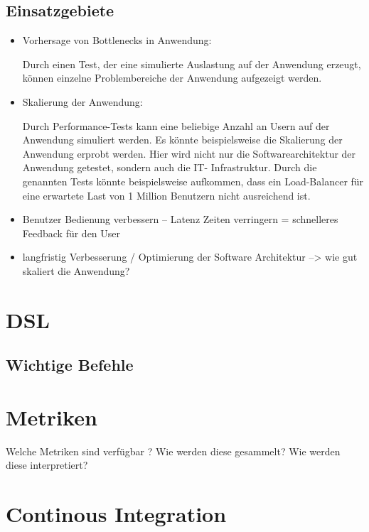 \subsection{Einsatzgebiete}

\begin{itemize}
    \item Vorhersage von Bottlenecks in Anwendung:

    Durch einen Test, der eine simulierte Auslastung auf der Anwendung erzeugt, können einzelne Problembereiche der Anwendung aufgezeigt werden.

    \item Skalierung der Anwendung:

    Durch Performance-Tests kann eine beliebige Anzahl an Usern auf der Anwendung simuliert werden. Es könnte beispielsweise die Skalierung der Anwendung erprobt werden. Hier wird nicht nur die Softwarearchitektur der Anwendung getestet, sondern auch die IT- Infrastruktur. Durch die genannten Tests könnte beispielsweise aufkommen, dass ein Load-Balancer für eine erwartete Last von 1 Million Benutzern nicht ausreichend ist.
    \item Benutzer Bedienung verbessern -- Latenz Zeiten verringern = schnelleres Feedback für den User
    \item langfristig Verbesserung / Optimierung der Software Architektur  --> wie gut skaliert die Anwendung?

\end{itemize}


\section{DSL}


\subsection{Wichtige Befehle}



\section{Metriken}

Welche Metriken sind verfügbar ?
Wie werden diese gesammelt?
Wie werden diese interpretiert?




\section{Continous Integration}

